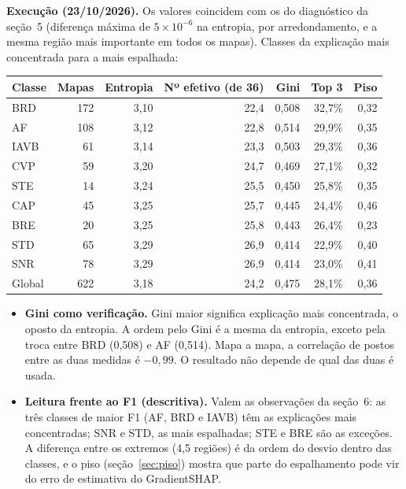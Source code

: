 \documentclass[11pt,a4paper]{article}
\begin{document}
\textbf{Execução (23/10/2026).} Os valores coincidem com os do diagnóstico da seção~5 (diferença máxima de $5 \times 10^{-6}$ na entropia, por arredondamento, e a mesma região mais importante em todos os mapas). Classes da explicação mais concentrada para a mais espalhada:
\begin{center}\small
\begin{tabular}{lrrrrrr}
\toprule
\textbf{Classe} & \textbf{Mapas} & \textbf{Entropia} & \textbf{Nº efetivo (de 36)} & \textbf{Gini} & \textbf{Top 3} & \textbf{Piso} \\
\midrule
BRD  & 172 & 3,10 & 22,4 & 0,508 & 32,7\% & 0,32 \\
AF   & 108 & 3,12 & 22,8 & 0,514 & 29,9\% & 0,35 \\
IAVB &  61 & 3,14 & 23,3 & 0,503 & 29,3\% & 0,36 \\
CVP  &  59 & 3,20 & 24,7 & 0,469 & 27,1\% & 0,32 \\
STE  &  14 & 3,24 & 25,5 & 0,450 & 25,8\% & 0,35 \\
CAP  &  45 & 3,25 & 25,7 & 0,445 & 24,4\% & 0,46 \\
BRE  &  20 & 3,25 & 25,8 & 0,443 & 26,4\% & 0,23 \\
STD  &  65 & 3,29 & 26,9 & 0,414 & 22,9\% & 0,40 \\
SNR  &  78 & 3,29 & 26,9 & 0,414 & 23,0\% & 0,41 \\
\midrule
Global & 622 & 3,18 & 24,2 & 0,475 & 28,1\% & 0,36 \\
\bottomrule
\end{tabular}
\end{center}
\begin{itemize}
\item \textbf{Gini como verificação.} Gini maior significa explicação mais concentrada, o oposto da entropia. A ordem pelo Gini é a mesma da entropia, exceto pela troca entre BRD (0,508) e AF (0,514). Mapa a mapa, a correlação de postos entre as duas medidas é $-0{,}99$. O resultado não depende de qual das duas é usada.
\item \textbf{Leitura frente ao F1 (descritiva).} Valem as observações da seção~6: as três classes de maior F1 (AF, BRD e IAVB) têm as explicações mais concentradas; SNR e STD, as mais espalhadas; STE e BRE são as exceções. A diferença entre os extremos (4,5 regiões) é da ordem do desvio dentro das classes, e o piso (seção~\ref{sec:piso}) mostra que parte do espalhamento pode vir do erro de estimativa do GradientSHAP.
\end{itemize}
\end{document}
